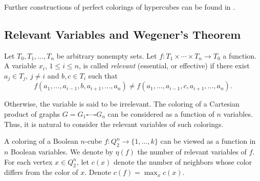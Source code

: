 \documentclass[11pt]{article}
\theoremstyle{definition}
\begin{document}
Further constructions of perfect colorings of hypercubes can be found in
\cite{Besp}.


\subsection{Relevant Variables and Wegener's Theorem}

Let $T_0,T_1, \dots, T_n$ be arbitrary nonempty sets. Let $f:T_1\times\cdots\times T_n\rightarrow T_0$ a function. A variable $x_i$, $1\leq i\leq
n$, is called {\sl relevant} (essential, or effective) if there
exist $a_j \in T_j$, $j\neq i$ and $b, c\in T_i$
such that
$$f(a_1,\dots,a_{i-1},b, a_{i+1},\dots, a_n)\neq f(a_1,\dots,a_{i-1},c, a_{i+1},\dots,
a_n).$$

 Otherwise, the variable is said to be irrelevant. The coloring of a Cartesian
product of graphs $G=G_1\square\cdots\square G_n$ can be considered as a function of $n$ variables. 
Thus, it is natural to consider the relevant variables of such colorings.


A coloring of a Boolean $n$-cube $f:Q_2^n\rightarrow
\{1,\dots,k\}$ can be viewed as a function in $n$
Boolean variables. We denote by $\eta(f)$ the number of relevant
variables of $f$. For each vertex $x\in Q_2^n$, let $c(x)$ denote the number of neighbors
 whose color differs from the color of $x$. Denote $c(f)=\max_x
c(x)$.
\end{document}
